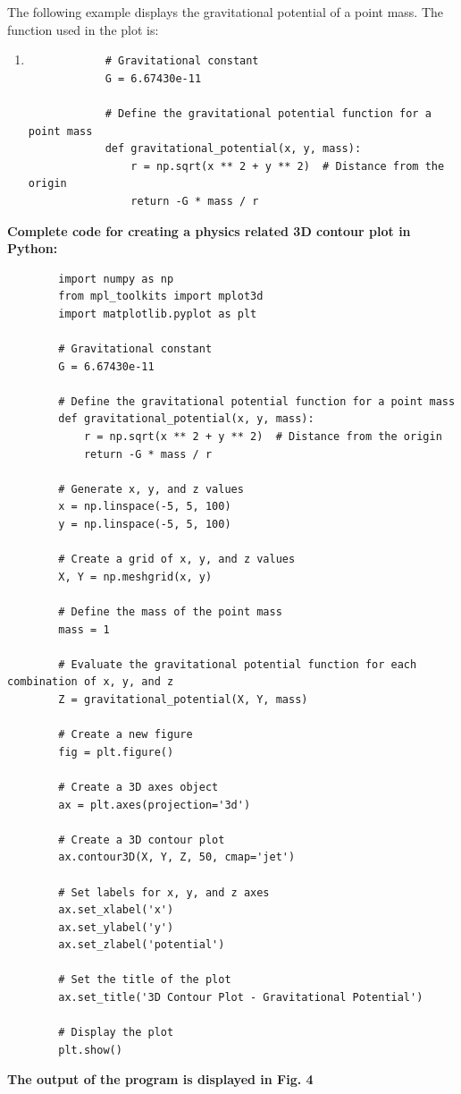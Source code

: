 \documentclass[
11pt, %
a4paper, %
oneside, %
headinclude,footinclude, %
BCOR5mm, %
]{scrartcl}
\begin{document}
	The following example displays the gravitational potential of a point mass.
	\newline
	\newline
	The function used in the plot is:
	\begin{enumerate}
		\item[] \begin{verbatim}
			# Gravitational constant
			G = 6.67430e-11
			
			# Define the gravitational potential function for a point mass
			def gravitational_potential(x, y, mass):
			    r = np.sqrt(x ** 2 + y ** 2)  # Distance from the origin
			    return -G * mass / r
		\end{verbatim}
	\end{enumerate}
	\textbf{Complete code for creating a physics related 3D contour plot in Python:}
	\begin{verbatim}
		import numpy as np
		from mpl_toolkits import mplot3d
		import matplotlib.pyplot as plt
		
		# Gravitational constant
		G = 6.67430e-11
		
		# Define the gravitational potential function for a point mass
		def gravitational_potential(x, y, mass):
		    r = np.sqrt(x ** 2 + y ** 2)  # Distance from the origin
		    return -G * mass / r
		
		# Generate x, y, and z values
		x = np.linspace(-5, 5, 100)
		y = np.linspace(-5, 5, 100)
		
		# Create a grid of x, y, and z values
		X, Y = np.meshgrid(x, y)
		
		# Define the mass of the point mass
		mass = 1
		
		# Evaluate the gravitational potential function for each combination of x, y, and z
		Z = gravitational_potential(X, Y, mass)
		
		# Create a new figure
		fig = plt.figure()
		
		# Create a 3D axes object
		ax = plt.axes(projection='3d')
		
		# Create a 3D contour plot
		ax.contour3D(X, Y, Z, 50, cmap='jet')
		
		# Set labels for x, y, and z axes
		ax.set_xlabel('x')
		ax.set_ylabel('y')
		ax.set_zlabel('potential')
		
		# Set the title of the plot
		ax.set_title('3D Contour Plot - Gravitational Potential')
		
		# Display the plot
		plt.show()
	\end{verbatim}
	\textbf{The output of the program is displayed in Fig. 4}
	
\end{document}
